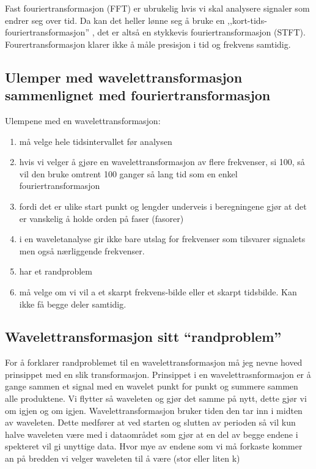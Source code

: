 \documentclass[a4paper,12pt,norsk]{article}
\begin{document}
Fast fouriertransformasjon (FFT) er ubrukelig hvis vi skal analysere signaler som endrer seg over tid. Da kan det heller lønne seg å bruke en ,,kort-tids-fouriertransformasjon'' , det er altså en stykkevis fouriertransformasjon (STFT). Fourertransformasjon klarer ikke å måle presisjon i tid og frekvens samtidig.

\subsection{Ulemper med wavelettransformasjon sammenlignet med fouriertransformasjon}

Ulempene med en wavelettransformasjon:

\begin{enumerate}
\item må velge hele tidsintervallet før analysen
\item hvis vi velger å gjøre en wavelettransformasjon av flere frekvenser, si 100, så vil den bruke omtrent 100 ganger så lang tid som en enkel fouriertransformasjon
\item fordi det er ulike start punkt og lengder underveis i beregningene gjør at det er vanskelig å holde orden på faser (fasorer)
\item i en waveletanalyse gir ikke bare utslag for frekvenser som tilsvarer signalets men også nærliggende frekvenser. 
\item har et randproblem
\item må velge om vi vil a et skarpt frekvens-bilde eller et skarpt tidsbilde. Kan ikke få begge deler samtidig. 
\end{enumerate}

\subsection{Wavelettransformasjon sitt “randproblem”}

For å forklarer randproblemet til en wavelettransformasjon må jeg nevne hoved prinsippet med en slik transformasjon. Prinsippet i en wavelettrasnformasjon er å gange sammen et signal med en wavelet punkt for punkt og summere sammen alle produktene. Vi flytter så waveleten og gjør det samme på nytt, dette gjør vi om igjen og om igjen. Wavelettransformasjon bruker tiden den tar inn i midten av waveleten. Dette medfører at ved starten og slutten av perioden så vil kun halve waveleten være med i dataområdet som gjør at en del av begge endene i spekteret vil gi unyttige data. Hvor mye av endene som vi må forkaste kommer an på bredden vi velger waveleten til å være (stor eller liten k)
\end{document}

